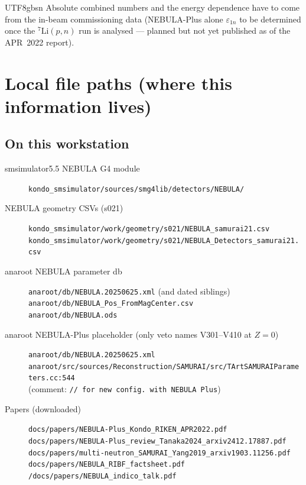 \documentclass[11pt,a4paper]{article}
\newcommand{\NPL}{NEBULA-Plus}
\begin{document}
\begin{CJK}{UTF8}{gbsn}
Absolute combined numbers and the energy dependence have to come from the
in-beam commissioning data (\NPL{} alone $\varepsilon_{1n}$ to be determined
once the $^{7}\mathrm{Li}(p,n)$ run is analysed --- planned but not yet
published as of the APR~2022 report).

\section{Local file paths (where this information lives)}
\label{sec:sources}

\subsection{On this workstation}

\begin{description}
  \item[smsimulator5.5 NEBULA G4 module]
    \texttt{kondo\_smsimulator/sources/smg4lib/detectors/NEBULA/}
  \item[NEBULA geometry CSVs (s021)]
    \texttt{kondo\_smsimulator/work/geometry/s021/NEBULA\_samurai21.csv} \\
    \texttt{kondo\_smsimulator/work/geometry/s021/NEBULA\_Detectors\_samurai21.csv}
  \item[anaroot NEBULA parameter db]
    \texttt{anaroot/db/NEBULA.20250625.xml} (and dated siblings) \\
    \texttt{anaroot/db/NEBULA\_Pos\_FromMagCenter.csv} \\
    \texttt{anaroot/db/NEBULA.ods}
  \item[anaroot \NPL{} placeholder (only veto names V301--V410 at $Z=0$)]
    \texttt{anaroot/db/NEBULA.20250625.xml}\\
    \texttt{anaroot/src/sources/Reconstruction/SAMURAI/src/TArtSAMURAIParameters.cc:544}
    \\ (comment: \texttt{// for new config. with NEBULA Plus})
  \item[Papers (downloaded)]
    \texttt{docs/papers/NEBULA-Plus\_Kondo\_RIKEN\_APR2022.pdf} \\
    \texttt{docs/papers/NEBULA-Plus\_review\_Tanaka2024\_arxiv2412.17887.pdf} \\
    \texttt{docs/papers/multi-neutron\_SAMURAI\_Yang2019\_arxiv1903.11256.pdf} \\
    \texttt{docs/papers/NEBULA\_RIBF\_factsheet.pdf} \\
    \texttt{/docs/papers/NEBULA\_indico\_talk.pdf}
\end{description}


\end{CJK}
\end{document}
